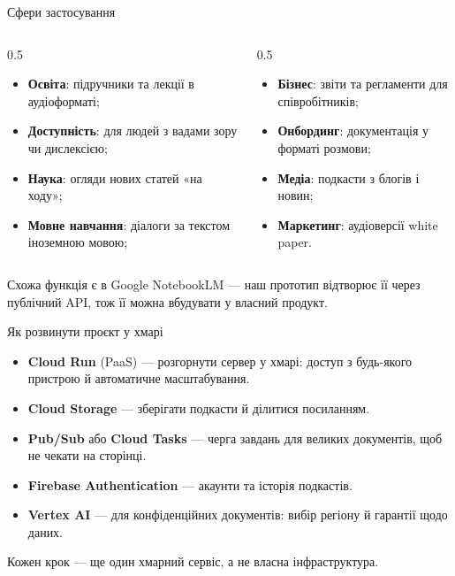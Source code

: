 \documentclass[aspectratio=43]{beamer}
\newcommand{\thesis}[1]{\begin{block}{}#1\end{block}}
\begin{document}
\begin{frame}{Сфери застосування}
  \begin{columns}[T]
    \begin{column}{0.5\textwidth}
      \begin{itemize}\small
        \item \textbf{Освіта}: підручники та лекції в аудіоформаті;
        \item \textbf{Доступність}: для людей з вадами зору чи дислексією;
        \item \textbf{Наука}: огляди нових статей «на ходу»;
        \item \textbf{Мовне навчання}: діалоги за текстом іноземною мовою;
      \end{itemize}
    \end{column}
    \begin{column}{0.5\textwidth}
      \begin{itemize}\small
        \item \textbf{Бізнес}: звіти та регламенти для співробітників;
        \item \textbf{Онбординг}: документація у форматі розмови;
        \item \textbf{Медіа}: подкасти з блогів і новин;
        \item \textbf{Маркетинг}: аудіоверсії white paper.
      \end{itemize}
    \end{column}
  \end{columns}

  \vspace{0.5em}
  \thesis{Схожа функція є в Google NotebookLM --- наш прототип відтворює
    її через публічний API, тож її можна вбудувати у власний продукт.}
\end{frame}

\begin{frame}{Як розвинути проєкт у хмарі}
  \begin{itemize}
    \item \textbf{Cloud Run} (PaaS) --- розгорнути сервер у хмарі: доступ з
      будь-якого пристрою й автоматичне масштабування.
    \item \textbf{Cloud Storage} --- зберігати подкасти й ділитися посиланням.
    \item \textbf{Pub/Sub} або \textbf{Cloud Tasks} --- черга завдань для
      великих документів, щоб не чекати на сторінці.
    \item \textbf{Firebase Authentication} --- акаунти та історія подкастів.
    \item \textbf{Vertex AI} --- для конфіденційних документів: вибір регіону
      й гарантії щодо даних.
  \end{itemize}

  \thesis{Кожен крок --- ще один хмарний сервіс, а не власна інфраструктура.}
\end{frame}
\end{document}
